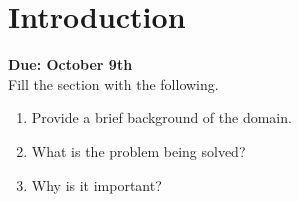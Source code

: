 \section{Introduction}\label{sec:intro}
{\bf Due: October 9th}\\ 
Fill the section with the following.

\begin{enumerate}
    \item Provide a brief background of the domain.
    \item What is the problem being solved?
    \item Why is it important?
\end{enumerate}
